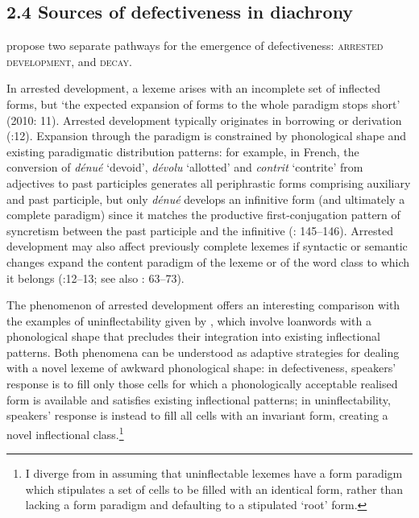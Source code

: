 \documentclass[output=paper]{langscibook}
\begin{document}
\subsection{2.4  Sources of defectiveness in diachrony}

\citet{BaermanCorbett2010} propose two separate pathways for the emergence of defectiveness: \textsc{arrested} \textsc{development}, and \textsc{decay}. 

In arrested development, a lexeme arises with an incomplete set of inflected forms, but ‘the expected expansion of forms to the whole paradigm stops short’ (2010: 11). Arrested development typically originates in borrowing or derivation (\citealt{BaermanCorbett2010}:12). Expansion through the paradigm is constrained by phonological shape and existing paradigmatic distribution patterns: for example, in French, the conversion of \textit{dénué} ‘devoid’, \textit{dévolu} ‘allotted’ and \textit{contrit} ‘contrite’ from adjectives to past participles generates all periphrastic forms comprising auxiliary and past participle, but only \textit{dénué} develops an infinitive form (and ultimately a complete paradigm) since it matches the productive first-conjugation pattern of syncretism between the past participle and the infinitive (\citealt{BachEsher2015}: 145–146). Arrested development may also affect previously complete lexemes if syntactic or semantic changes expand the content paradigm of the lexeme or of the word class to which it belongs (\citealt{BaermanCorbett2010}:12–13; see also \citealt{Sims2015}: 63–73). 

The phenomenon of arrested development offers an interesting comparison with the examples of uninflectability given by \citet{Spencer2020}, which involve loanwords with a phonological shape that precludes their integration into existing inflectional patterns. Both phenomena can be understood as adaptive strategies for dealing with a novel lexeme of awkward phonological shape: in defectiveness, speakers’ response is to fill only those cells for which a phonologically acceptable realised form is available and satisfies existing inflectional patterns; in uninflectability, speakers’ response is instead to fill all cells with an invariant form, creating a novel inflectional class.\footnote{I diverge from \citet{Spencer2020} in assuming that uninflectable lexemes have a form paradigm which stipulates a set of cells to be filled with an identical form, rather than lacking a form paradigm and defaulting to a stipulated ‘root’ form.} 
\end{document}
